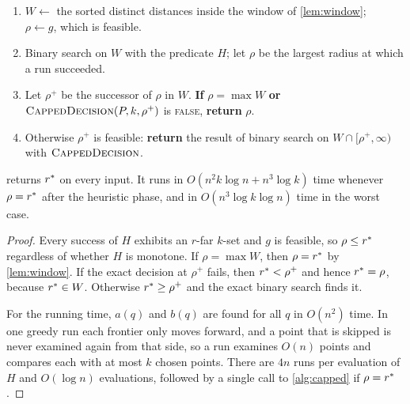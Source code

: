 \begin{algorithm}[H]
\caption{$\AlgCert(P,k)$\quad ($k\ge3$)}\label{alg:certified}
\begin{enumerate}[label=\arabic*:,leftmargin=2em,itemsep=1pt,topsep=2pt]
\item $W\gets$ the sorted distinct distances inside the window of \cref{lem:window};\ \ $\rho\gets g$, which is feasible.
\item Binary search on $W$ with the predicate $H$; let $\rho$ be the largest radius at which a run succeeded.
\item Let $\rho^+$ be the successor of $\rho$ in $W$. \textbf{If} $\rho=\max W$ \textbf{or} $\textsc{CappedDecision}(P,k,\rho^+)$ is \textsc{false}, \textbf{return} $\rho$.
\item Otherwise $\rho^+$ is feasible: \textbf{return} the result of binary search on $W\cap[\rho^+,\infty)$ with $\textsc{CappedDecision}$.
\end{enumerate}
\end{algorithm}

\begin{theorem}\label{thm:cert}
 returns $r^{*}$ on every input. It runs in
$O(n^2k\log n+n^3\log k)$ time whenever $\rho=r^{*}$ after the heuristic
phase, and in $O(n^3\log k\log n)$ time in the worst case.
\end{theorem}
\begin{proof}
Every success of $H$ exhibits an $r$-far $k$-set and $g$ is feasible, so
$\rho\le r^{*}$ regardless of whether $H$ is monotone. If $\rho=\max W$, then
$\rho=r^{*}$ by \cref{lem:window}. If the exact decision at $\rho^+$ fails,
then $r^{*}<\rho^+$ and hence $r^{*}=\rho$, because $r^{*}\in W$. Otherwise
$r^{*}\ge\rho^+$ and the exact binary search finds it.

For the running time, $a(q)$ and $b(q)$ are found for all $q$ in $O(n^2)$
time. In one greedy run each frontier only moves forward, and a point that is
skipped is never examined again from that side, so a run examines $O(n)$
points and compares each with at most $k$ chosen points. There are $4n$ runs
per evaluation of $H$ and $O(\log n)$ evaluations, followed by a single call
to \cref{alg:capped} if $\rho=r^{*}$.
\end{proof}

